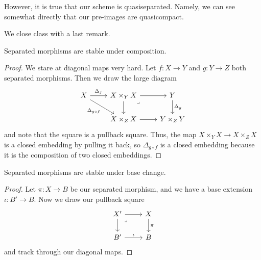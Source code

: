 \documentclass[../notes.tex]{subfiles}
\begin{document}
\begin{remark}
	However, it is true that our scheme is quasiseparated. Namely, we can see somewhat directly that our pre-images are quasicompact.
\end{remark}
We close class with a last remark.
\begin{lemma}
	Separated morphisms are stable under composition.
\end{lemma}
\begin{proof}
	We stare at diagonal maps very hard. Let $f\colon X\to Y$ and $g\colon Y\to Z$ both separated morphisms. Then we draw the large diagram
	\[\begin{tikzcd}
		X & {X\times_YX} & Y \\
		& {X\times_ZX} & {Y\times_ZY}
		\arrow["{\Delta _g}", from=1-3, to=2-3]
		\arrow["{\Delta_f}", from=1-1, to=1-2]
		\arrow["{\Delta_{g\circ f}}"', from=1-1, to=2-2]
		\arrow[from=1-2, to=1-3]
		\arrow[from=2-2, to=2-3]
		\arrow[from=1-2, to=2-2]
		\arrow["\lrcorner"{anchor=center, pos=0.125}, draw=none, from=1-2, to=2-3]
	\end{tikzcd}\]
	and note that the square is a pullback square. Thus, the map $X\times_YX\to X\times_ZX$ is a closed embedding by pulling it back, so $\Delta_{g\circ f}$ is a closed embedding because it is the composition of two closed embeddings.
\end{proof}
\begin{lemma}
	Separated morphisms are stable under base change.
\end{lemma}
\begin{proof}
	Let $\pi\colon X\to B$ be our separated morphism, and we have a base extension $\iota\colon B'\to B$. Now we draw our pullback square
	\[\begin{tikzcd}
		{X'} & X \\
		{B'} & B
		\arrow["\iota", from=2-1, to=2-2]
		\arrow["\pi", from=1-2, to=2-2]
		\arrow[from=1-1, to=2-1]
		\arrow[from=1-1, to=1-2]
		\arrow["\lrcorner"{anchor=center, pos=0.125}, draw=none, from=1-1, to=2-2]
	\end{tikzcd}\]
	and track through our diagonal maps.
\end{proof}
\end{document}
